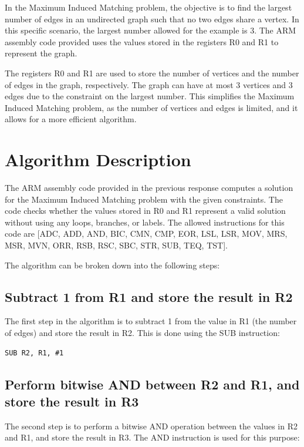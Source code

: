 In the Maximum Induced Matching problem, the objective is to find the largest number of edges in an undirected graph such that no two edges share a vertex. In this specific scenario, the largest number allowed for the example is 3. The ARM assembly code provided uses the values stored in the registers R0 and R1 to represent the graph.

The registers R0 and R1 are used to store the number of vertices and the number of edges in the graph, respectively. The graph can have at most 3 vertices and 3 edges due to the constraint on the largest number. This simplifies the Maximum Induced Matching problem, as the number of vertices and edges is limited, and it allows for a more efficient algorithm.

\section{Algorithm Description}

The ARM assembly code provided in the previous response computes a solution for the Maximum Induced Matching problem with the given constraints. The code checks whether the values stored in R0 and R1 represent a valid solution without using any loops, branches, or labels. The allowed instructions for this code are [ADC, ADD, AND, BIC, CMN, CMP, EOR, LSL, LSR, MOV, MRS, MSR, MVN, ORR, RSB, RSC, SBC, STR, SUB, TEQ, TST].

The algorithm can be broken down into the following steps:

\subsection{Subtract 1 from R1 and store the result in R2}

The first step in the algorithm is to subtract 1 from the value in R1 (the number of edges) and store the result in R2. This is done using the SUB instruction:

\begin{verbatim}
SUB R2, R1, #1
\end{verbatim}

\subsection{Perform bitwise AND between R2 and R1, and store the result in R3}

The second step is to perform a bitwise AND operation between the values in R2 and R1, and store the result in R3. The AND instruction is used for this purpose:

